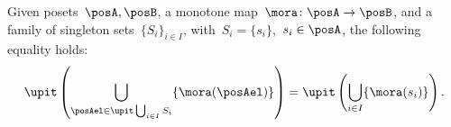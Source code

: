 \begin{lemma}
  \label{lem:unpack_u_functor}
  Given posets~$\posA,\posB$, a monotone map~$\mora \colon \posA \to \posB$, and a family of singleton sets~$\{S_i\}_{i\in I}$, with~$S_i=\{s_i\}$,~$s_i\in \posA$, the following equality holds:
  \begin{equation}
    \label{eq:lemma_unpack}
    \upit \left( \bigcup_{\posAel \in \upit \bigcup_{i\in I}S_i}\{\mora(\posAel)\}\right)= \upit \left( \bigcup_{i\in I} \{\mora(s_i)\}\right).
  \end{equation}
\end{lemma}


